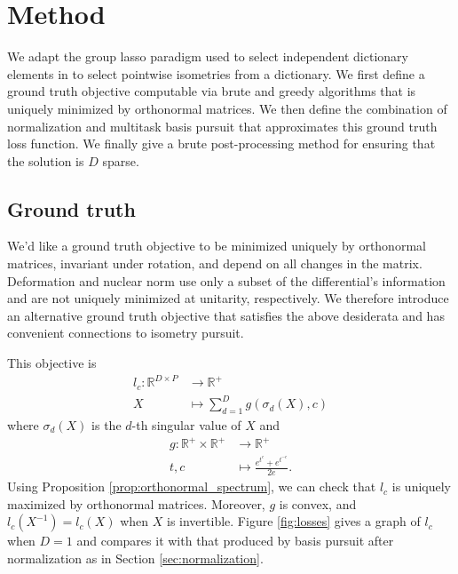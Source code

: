 \section{Method}

We adapt the group lasso paradigm used to select independent dictionary elements in \citet{Koelle2022-ju, Koelle2024-no} to select pointwise isometries from a dictionary.
We first define a ground truth objective computable via brute and greedy algorithms that is uniquely minimized by orthonormal matrices.
We then define the combination of normalization and multitask basis pursuit that approximates this ground truth loss function.
We finally give a brute post-processing method for ensuring that the solution is $D$ sparse.

\subsection{Ground truth}
\label{sec:ground_truth}

We'd like a ground truth objective to be minimized uniquely by orthonormal matrices, invariant under rotation, and depend on all changes in the matrix.
Deformation \citep{Kohli2021-lr} and nuclear norm \citep{Boyd2004-ql} use only a subset of the differential's information and are not uniquely minimized at unitarity, respectively.
We therefore introduce an alternative ground truth objective that satisfies the above desiderata and has convenient connections to isometry pursuit.

This objective is
\begin{align}
l_{c}: \mathbb R^{D \times P} &\to \mathbb R^{+} \\
X &\mapsto \sum_{d = 1}^D g(\sigma_d( X), c)
\end{align}
where $\sigma_d ( X)$ is the $d$-th singular value of $ X$ and
\begin{align}
g: \mathbb R^+ \times \mathbb R^+ &\to \mathbb R^+ \\
t,c &\mapsto \frac{e^{t^c} + e^{t^{-c}}}{2e}.
\end{align}
Using Proposition \ref{prop:orthonormal_spectrum}, we can check that $l_c$ is uniquely maximized by orthonormal matrices.
Moreover, $g$ is convex, and $l_c( X^{-1}) = l_c( X)$ when $X$ is invertible.
Figure \ref{fig:losses} gives a graph of $l_c$ when $D=1$ and compares it with that produced by basis pursuit after normalization as in Section \ref{sec:normalization}.

